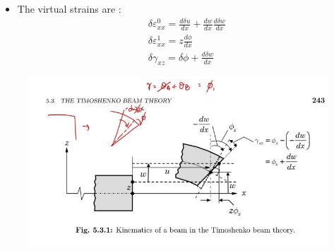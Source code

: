 	\begin{frame}
		\begin{itemize}
			\item The virtual strains are :
			\begin{equation}
				\begin{aligned}
					\delta \varepsilon_{xx}^0 = \frac{d\delta u}{dx} + \frac{dw}{dx}\frac{d\delta w}{dx} \\
					\delta \varepsilon^1_{xx} = z \frac{d\phi}{dx} \\
					\delta \gamma_{xz} = \delta \phi + \frac{d \delta w}{dx} 
				\end{aligned}
			\end{equation}	
		\end{itemize}
		\begin{figure}
			\centering
			\includegraphics[width=0.66 \linewidth]{Figure/fig22} 		
		\end{figure}
	\end{frame}


